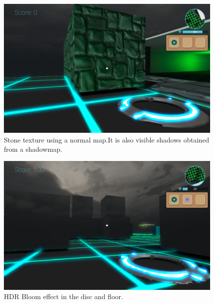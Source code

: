 \documentclass[a4paper]{article}
\begin{document}
  \begin{figure}[H]
      \begin{center}
          \includegraphics[width=\linewidth]{BumpMapping.jpg}

      \end{center}
      \caption{Stone texture using a normal map.It is also visible shadows obtained from a shadowmap. }
  \end{figure}
    \begin{figure}[H]
      \begin{center}
          \includegraphics[width=\linewidth]{Bloom.jpg}

      \end{center}
      \caption{HDR Bloom effect in the disc and floor. }
  \end{figure}
\end{document}
